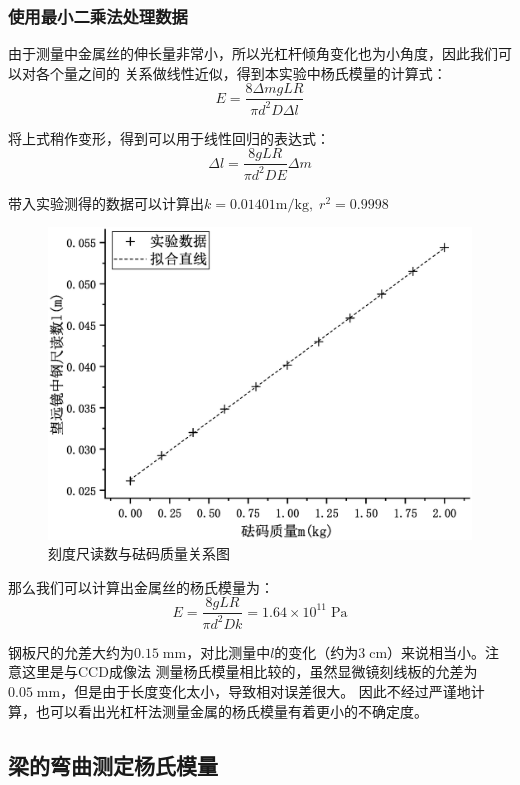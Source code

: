 \documentclass[a4paper]{ctexart}
\def\mm{\mathrm{mm}}
\def\cm{\mathrm{cm}}
\begin{document}
	\subsubsection{使用最小二乘法处理数据}
	\par 
	由于测量中金属丝的伸长量非常小，所以光杠杆倾角变化也为小角度，因此我们可以对各个量之间的
	关系做线性近似，得到本实验中杨氏模量的计算式：
	$$
	E = \frac{8\Delta m g L R}{\pi d^{2} D \Delta l}
	$$
	\par 
	将上式稍作变形，得到可以用于线性回归的表达式：
	$$
	\Delta l = \frac{8gLR}{\pi d^{2} D E} \Delta m
	$$
	\par 
	带入实验测得的数据可以计算出$k=0.01401\mathrm{m/kg},\; r^2 = 0.9998$
	\begin{figure}[htbp]
		\centering
		\includegraphics[scale=0.4]{2_curve.eps}
		\caption{刻度尺读数与砝码质量关系图}
	\end{figure}
	\par 
	那么我们可以计算出金属丝的杨氏模量为：
	$$
	E = \frac{8gLR}{\pi d^{2}Dk} = 1.64 \times 10^{11}\;\mathrm{Pa}
	$$
	\par 
	钢板尺的允差大约为$0.15\;\mm$，对比测量中$l$的变化（约为$3\;\cm$）来说相当小。注意这里是与CCD成像法
	测量杨氏模量相比较的，虽然显微镜刻线板的允差为$0.05\;\mm$，但是由于长度变化太小，导致相对误差很大。
	因此不经过严谨地计算，也可以看出光杠杆法测量金属的杨氏模量有着更小的不确定度。

	\subsection{梁的弯曲测定杨氏模量}
\end{document}
